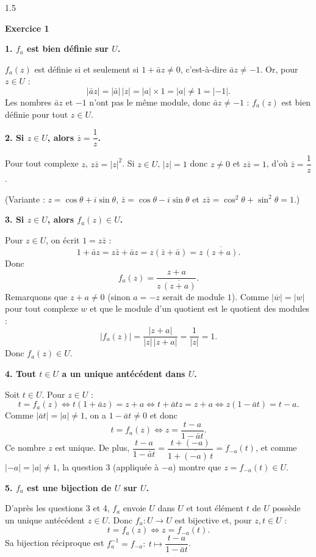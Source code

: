 \documentclass[12pt]{article}
\begin{document}
\begin{spacing}{1.5}


\textbf{Exercice 1}

\textbf{1. $f_a$ est bien définie sur $U$.}

$f_a(z)$ est définie si et seulement si $1+\bar a z\neq0$, c'est-à-dire $\bar a z\neq-1$. Or, pour $z\in U$ :
\[
|\bar a z|=|\bar a|\,|z|=|a|\times1=|a|\neq1=|-1| .
\]
Les nombres $\bar a z$ et $-1$ n'ont pas le même module, donc $\bar az\neq-1$ : $f_a(z)$ est bien définie pour tout $z\in U$.

\textbf{2. Si $z\in U$, alors $\bar z=\dfrac1z$.}

Pour tout complexe $z$, $z\bar z=|z|^2$. Si $z\in U$, $|z|=1$ donc $z\neq0$ et $z\bar z=1$, d'où $\bar z=\dfrac1z$.

(Variante : $z=\cos\theta+i\sin\theta$, $\bar z=\cos\theta-i\sin\theta$ et $z\bar z=\cos^2\theta+\sin^2\theta=1$.)

\textbf{3. Si $z\in U$, alors $f_a(z)\in U$.}

Pour $z\in U$, on écrit $1=z\bar z$ :
\[
1+\bar az=z\bar z+\bar a z=z(\bar z+\bar a)=z\,\overline{(z+a)} .
\]
Donc
\[
f_a(z)=\frac{z+a}{z\,\overline{(z+a)}} .
\]
Remarquons que $z+a\neq0$ (sinon $a=-z$ serait de module $1$). Comme $|\overline{w}|=|w|$ pour tout complexe $w$ et que le module d'un quotient est le quotient des modules :
\[
|f_a(z)|=\frac{|z+a|}{|z|\,|z+a|}=\frac1{|z|}=1 .
\]
Donc $f_a(z)\in U$.

\textbf{4. Tout $t\in U$ a un unique antécédent dans $U$.}

Soit $t\in U$. Pour $z\in U$ :
\[
t=f_a(z)\iff t(1+\bar az)=z+a\iff t+\bar a tz=z+a\iff z(1-\bar a t)=t-a .
\]
Comme $|\bar a t|=|a|\neq1$, on a $1-\bar at\neq0$ et donc
\[
t=f_a(z)\iff z=\frac{t-a}{1-\bar at}.
\]
Ce nombre $z$ est unique. De plus, $\dfrac{t-a}{1-\bar a t}=\dfrac{t+(-a)}{1+\overline{(-a)}\,t}=f_{-a}(t)$, et comme $|-a|=|a|\neq1$, la question 3 (appliquée à $-a$) montre que $z=f_{-a}(t)\in U$.

\textbf{5. $f_a$ est une bijection de $U$ sur $U$.}

D'après les questions 3 et 4, $f_a$ envoie $U$ dans $U$ et tout élément $t$ de $U$ possède un unique antécédent $z\in U$. Donc $f_a:U\to U$ est bijective et, pour $z,t\in U$ :
\[
t=f_a(z)\iff z=f_{-a}(t).
\]
Sa bijection réciproque est $\boxed{f_a^{-1}=f_{-a}:\ t\mapsto\dfrac{t-a}{1-\bar at}}$.


\end{spacing}
\end{document}
